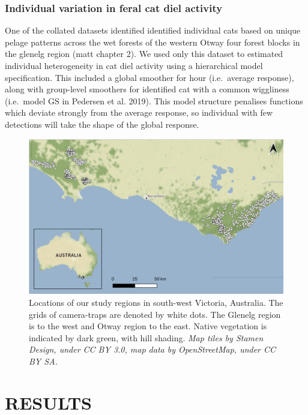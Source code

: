 \documentclass[]{elsarticle} %
\begin{document}
\hypertarget{individual-variation-in-feral-cat-diel-activity}{%
\subsubsection{Individual variation in feral cat diel activity}\label{individual-variation-in-feral-cat-diel-activity}}

One of the collated datasets identified identified individual cats based on unique pelage patterns across the wet forests of the western Otway four forest blocks in the glenelg region (matt chapter 2). We used only this dataset to estimated individual heterogeneity in cat diel activity using a hierarchical model specification. This included a global smoother for hour (i.e.~average response), along with group-level smoothers for identified cat with a common wiggliness (i.e.~model GS in Pedersen et al. 2019). This model structure penalises functions which deviate strongly from the average response, so individual with few detections will take the shape of the global response.

\newpage

\begin{figure}
\includegraphics[width=16.68in]{../figs/fig1_map} \caption{Locations of our study regions in south-west Victoria, Australia. The grids of camera-traps are denoted by white dots. The Glenelg region is to the west and Otway region to the east. Native vegetation is indicated by dark green, with hill shading. \textit{Map tiles by Stamen Design, under CC BY 3.0, map data by OpenStreetMap, under CC BY SA.}}\label{fig:diel-map}
\end{figure}

\newpage

\hypertarget{results}{%
\section{RESULTS}\label{results}}
\end{document}

